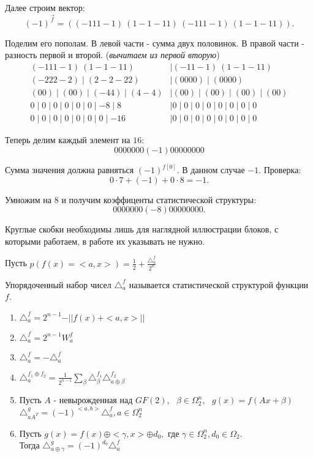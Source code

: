 Далее строим вектор:
$$
(-1)^{\vec{f}} = ((-\!1 1 1\!-\!1) \  (1\!-\!1\!-\!11)\  (-\!111\!-\!1) \  (1\!-\!1\!-\!11)).
$$

Поделим его пополам. В левой части - сумма двух половинок. В правой части - разность первой и второй. (\emph{вычитаем из первой вторую})
\begin{align*}
	(-\!111\!-\!1) \ (1\!-\!1\!-\!11) &\mid (-\!11\!-\!1) \ (1\!-\!1\!-\!11)\\
	(-\!222\!-\!2) \mid (2\!-\!2\!-\!22) &\mid (0000) \mid (0000)\\
	(00) \mid (00) \mid (-\!44) \mid (4\!-\!4) &\mid (00) \mid (00) \mid (00) \mid (00)\\
	0 \mid 0 \mid 0 \mid 0 \mid 0 \mid 0 \mid -\!8 \mid 8 &\mid 0 \mid 0 \mid 0 \mid 0 \mid 0 \mid 0 \mid 0 \mid 0\\
	0 \mid 0 \mid 0 \mid 0 \mid 0 \mid 0 \mid 0 \mid -\!16 &\mid 0 \mid 0 \mid 0 \mid 0 \mid 0 \mid 0 \mid 0 \mid 0 
\end{align*}

Теперь делим каждый элемент на $16$:
$$
0000000(-\!1)00000000
$$

Сумма значения должна равняться $(-1)^{f[0]}$. В данном случае $-1$.
Проверка:
$$
0 \cdot 7 + (-1) + 0 \cdot 8 = -1.
$$

Умножим на 8 и получим коэффиценты статистической структуры:
$$
0000000(-\!8)00000000.
$$

\prim Круглые скобки необходимы лишь для наглядной иллюстрации блоков, с которыми работаем, в работе их указывать не нужно.

\newpage
Пусть $p(f(x) = <a, x>) = \frac{1}{2} + \frac{\triangle_a^f}{2^n}$

\opr
Упорядоченный набор чисел $\triangle_a^f$ называется статистической структурой функции $f$.

\utv
\begin{enumerate}
	\item $\triangle_a^f = 2^{n - 1} - \vert\vert f(x) + <a, x> \vert\vert$
	\item $\triangle_a^f = 2^{n - 1} W_a^f$
	\item $\triangle_a^f = -\triangle_a^f$
	\item $\triangle_a^{f_1 \oplus f_2} = \frac{1}{2^{n - 1}} \sum_{\beta}\triangle_{\beta}^{f_1}\triangle_{a \oplus \beta}^{f_2}$
	\item Пусть $A$ - невырожденная над $GF(2),\text{ } \beta \in \Omega_2^n,\text{ } g(x) = f(Ax + \beta) \text{ }$\\
	$\triangle_{aA^T}^g = (-1)^{<a,b>}\triangle_a^f, a \in \Omega_2^n$

	\item Пусть $g(x) = f(x) \oplus <\gamma, x> \oplus d_0, $ где $\gamma \in \Omega_2^n, d_0 \in \Omega_2$.\\
	Тогда $\triangle_{a\oplus\gamma}^g = (-1)^{d_0}\triangle_a^f$
\end{enumerate}